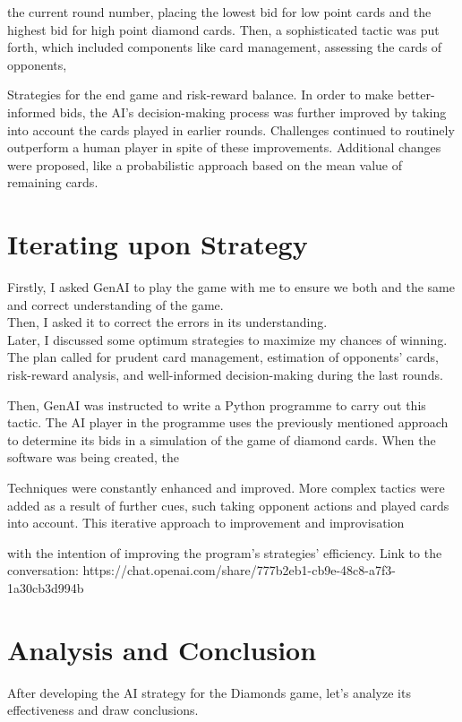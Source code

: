 \documentclass[letterpaper,12pt]{article}
\begin{document}
the current round number, placing the lowest bid for low point cards and the highest bid for high point diamond cards. Then, a sophisticated tactic was put forth, which included components like card management, assessing the cards of opponents,

Strategies for the end game and risk-reward balance. In order to make better-informed bids, the AI's decision-making process was further improved by taking into account the cards played in earlier rounds. Challenges continued to routinely outperform a human player in spite of these improvements. Additional changes were proposed, like a probabilistic approach based on the mean value of remaining cards.


\section{Iterating upon Strategy}
Firstly, I asked GenAI to play the game with me to ensure we both and the same and correct understanding of the game.\\
Then, I asked it to correct the errors in its understanding.\\
Later, I discussed some optimum strategies to maximize my chances of winning.\\
The plan called for prudent card management, estimation of opponents' cards, risk-reward analysis, and well-informed decision-making during the last rounds.

Then, GenAI was instructed to write a Python programme to carry out this tactic. The AI player in the programme uses the previously mentioned approach to determine its bids in a simulation of the game of diamond cards. When the software was being created, the

Techniques were constantly enhanced and improved. More complex tactics were added as a result of further cues, such taking opponent actions and played cards into account. This iterative approach to improvement and improvisation

with the intention of improving the program's strategies' efficiency.
Link to the conversation:  
    https://chat.openai.com/share/777b2eb1-cb9e-48c8-a7f3-1a30cb3d994b



\section{Analysis and Conclusion}
After developing the AI strategy for the Diamonds game, let's analyze its effectiveness and draw conclusions.
\end{document}
